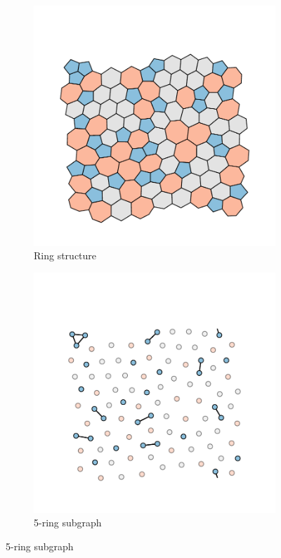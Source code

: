 \begin{figure}[bt]
     \centering
     
     \begin{subfigure}[b]{0.26\textwidth}
         \centering
         \includegraphics[width=\textwidth]{./figures/targeted_opt/subgraph_rings.pdf}
         \caption{Ring structure}
         \label{fig:percsub1}
     \end{subfigure}
     \hspace{1cm}
      \begin{subfigure}[b]{0.26\textwidth}
         \centering
         \includegraphics[width=\textwidth]{./figures/targeted_opt/subgraph_5.pdf}
         \caption{5\--ring subgraph}
         \label{fig:percsub2}
     \end{subfigure}
     \vspace{0.2cm}
     

\end{figure}
